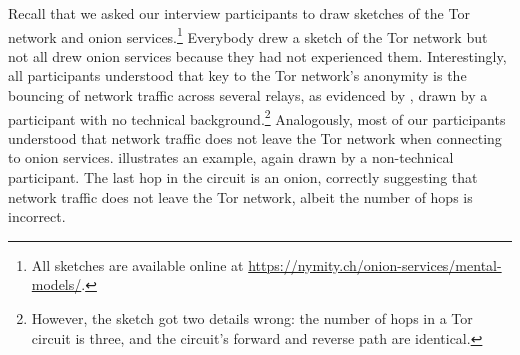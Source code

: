Recall that we asked our interview participants to draw sketches of the Tor
network and onion services.\footnote{All sketches are available online at
\url{https://nymity.ch/onion-services/mental-models/}.}  Everybody drew a
sketch of the Tor network but not all drew onion services because they had not
experienced them.  Interestingly, all participants understood that key to the
Tor network's anonymity is the bouncing of network traffic across several
relays, as evidenced by , drawn by a participant with no
technical background.\footnote{However, the sketch got two details wrong: the
number of hops in a Tor circuit is three, and the circuit's forward and reverse
path are identical.} Analogously, most of our participants understood that
network traffic does not leave the Tor network when connecting to onion
services.   illustrates an example, again drawn by a
non-technical participant.  The last hop in the circuit is an onion, correctly
suggesting that network traffic does not leave the Tor network, albeit the
number of hops is incorrect.

